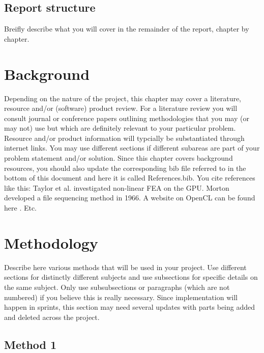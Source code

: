 \documentclass[a4paper, oneside, 11pt]{report}
\begin{document}
\section{Report structure}
Breifly describe what you will cover in the remainder of the report, chapter by chapter.

\chapter{Background}

Depending on the nature of the project, this chapter may cover a literature, resource and/or (software) product review. For a literature review you will consult journal or conference papers outlining methodologies that you may (or may not) use but which are definitely relevant to your particular problem. Resource and/or product information will typcially be substantiated through internet links. 
You may use different sections if different subareas are part of your problem statement and/or solution. 
Since this chapter covers background resources, you should also update the corresponding bib file referred to in the bottom of this document and here it is called References.bib.
You cite references like this: Taylor et al. \cite{Taylor:2007} investigated non-linear FEA on the GPU. Morton \cite{Morton:1966} developed a file sequencing method in 1966. A website on OpenCL can be found here \cite{Soos:2012}. Etc.

\chapter{Methodology}\label{MethLab}

Describe here various methods that will be used in your project. Use different sections for distinctly different subjects and use subsections for specific details on the same subject. Only use subsubsections or paragraphs (which are not numbered) if you believe this is really necessary. Since implementation will happen in sprints, this section may need several updates with parts being added and deleted across the project.

\section{Method 1}
\end{document}
